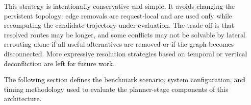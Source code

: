 This strategy is intentionally conservative and simple. It avoids changing the persistent topology: edge removals are request-local and are used only while recomputing the candidate trajectory under evaluation. The trade-off is that resolved routes may be longer, and some conflicts may not be solvable by lateral rerouting alone if all useful alternatives are removed or if the graph becomes disconnected. More expressive resolution strategies based on temporal or vertical deconfliction are left for future work.

The following section defines the benchmark scenario, system configuration, and timing methodology used to evaluate the planner-stage components of this architecture.
